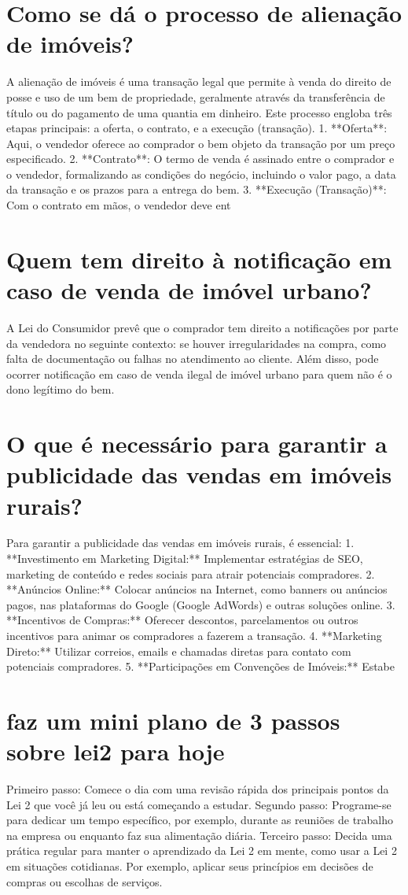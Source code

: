 \documentclass[11pt,a4paper]{article}
\begin{document}
\section{Como se dá o processo de alienação de imóveis?}
A alienação de imóveis é uma transação legal que permite à venda do direito de posse e uso de um bem de propriedade, geralmente através da transferência de título ou do pagamento de uma quantia em dinheiro. Este processo engloba três etapas principais: a oferta, o contrato, e a execução (transação). 1. **Oferta**: Aqui, o vendedor oferece ao comprador o bem objeto da transação por um preço especificado. 2. **Contrato**: O termo de venda é assinado entre o comprador e o vendedor, formalizando as condições do negócio, incluindo o valor pago, a data da transação e os prazos para a entrega do bem. 3. **Execução (Transação)**: Com o contrato em mãos, o vendedor deve ent

\section{Quem tem direito à notificação em caso de venda de imóvel urbano?}
A Lei do Consumidor prevê que o comprador tem direito a notificações por parte da vendedora no seguinte contexto: se houver irregularidades na compra, como falta de documentação ou falhas no atendimento ao cliente. Além disso, pode ocorrer notificação em caso de venda ilegal de imóvel urbano para quem não é o dono legítimo do bem.

\section{O que é necessário para garantir a publicidade das vendas em imóveis rurais?}
Para garantir a publicidade das vendas em imóveis rurais, é essencial: 1. **Investimento em Marketing Digital:** Implementar estratégias de SEO, marketing de conteúdo e redes sociais para atrair potenciais compradores. 2. **Anúncios Online:** Colocar anúncios na Internet, como banners ou anúncios pagos, nas plataformas do Google (Google AdWords) e outras soluções online. 3. **Incentivos de Compras:** Oferecer descontos, parcelamentos ou outros incentivos para animar os compradores a fazerem a transação. 4. **Marketing Direto:** Utilizar correios, emails e chamadas diretas para contato com potenciais compradores. 5. **Participações em Convenções de Imóveis:** Estabe

\section{faz um mini plano de 3 passos sobre lei2 para hoje}
Primeiro passo: Comece o dia com uma revisão rápida dos principais pontos da Lei 2 que você já leu ou está começando a estudar. Segundo passo: Programe-se para dedicar um tempo específico, por exemplo, durante as reuniões de trabalho na empresa ou enquanto faz sua alimentação diária. Terceiro passo: Decida uma prática regular para manter o aprendizado da Lei 2 em mente, como usar a Lei 2 em situações cotidianas. Por exemplo, aplicar seus princípios em decisões de compras ou escolhas de serviços.
\end{document}
